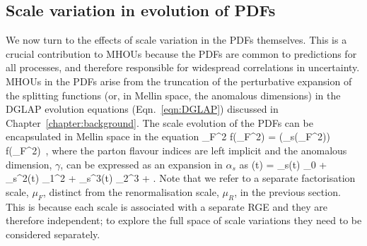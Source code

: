 \subsection{Scale variation in evolution of PDFs}
We now turn to the effects of scale variation in the PDFs themselves. This is a crucial contribution to MHOUs because the PDFs are common to predictions for all processes, and therefore responsible for widespread correlations in uncertainty. MHOUs in the PDFs arise from the truncation of the perturbative expansion of the splitting functions (or, in Mellin space, the anomalous dimensions) in the DGLAP evolution equations (Eqn.~\ref{eqn:DGLAP}) discussed in Chapter~\ref{chapter:background}. The scale evolution of the PDFs can be encapsulated in Mellin space in the equation
\be \label{eqn:mellindglap}
	\mu_F^2  f(\mu_F^2) = \gamma(\alpha_s(\mu_F^2)) f(\mu_F^2)\, ,
\ee
where the parton flavour indices are left implicit and the anomalous dimension, $\gamma$, can be expressed as an expansion in $\alpha_s$ as
\be  \label{eqn:anomdimexp}
\gamma(t) =  \alpha_s(t) \gamma_0 + \alpha_s^2(t) \gamma_1^2  + \alpha_s^3(t) \gamma_2^3 + \cdots .
\ee
Note that we refer to a separate factorisation scale, $\mu_F$, distinct from the renormalisation scale, $\mu_R$, in the previous section. This is because each scale is associated with a separate RGE and they are therefore independent; to explore the full space of scale variations they need to be considered separately. 

